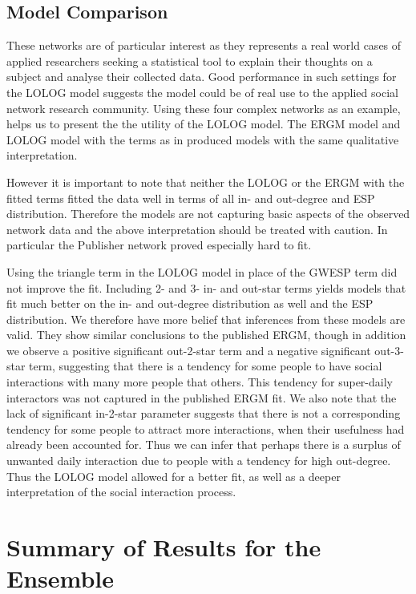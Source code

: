 \documentclass[
]{statsoc}
\begin{document}
\subsection{Model Comparison}

These networks are of particular interest as they represents a real
world cases of applied researchers seeking a statistical tool to explain
their thoughts on a subject and analyse their collected data. Good
performance in such settings for the LOLOG model suggests the model
could be of real use to the applied social network research community.
Using these four complex networks as an example, helps us to present the
the utility of the LOLOG model. The ERGM model and LOLOG model with the
terms as in \cite{Sailer2012} produced models with the same qualitative
interpretation.

However it is important to note that neither the LOLOG or the ERGM with
the fitted terms fitted the data well in terms of all in- and out-degree
and ESP distribution. Therefore the models are not capturing basic
aspects of the observed network data and the above interpretation should
be treated with caution. In particular the Publisher network proved
especially hard to fit.

Using the triangle term in the LOLOG model in place of the GWESP term
did not improve the fit. Including 2- and 3- in- and out-star terms
yields models that fit much better on the in- and out-degree
distribution as well and the ESP distribution. We therefore have more
belief that inferences from these models are valid. They show similar
conclusions to the published ERGM, though in addition we observe a
positive significant out-2-star term and a negative significant
out-3-star term, suggesting that there is a tendency for some people to
have social interactions with many more people that others. This
tendency for super-daily interactors was not captured in the published
ERGM fit. We also note that the lack of significant in-2-star parameter
suggests that there is not a corresponding tendency for some people to
attract more interactions, when their usefulness had already been
accounted for. Thus we can infer that perhaps there is a surplus of
unwanted daily interaction due to people with a tendency for high
out-degree. Thus the LOLOG model allowed for a better fit, as well as a
deeper interpretation of the social interaction process.

\section{Summary of Results for the Ensemble}\label{sec:results}
\end{document}
